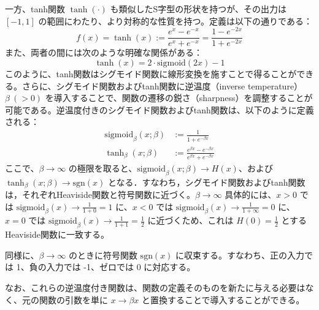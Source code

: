 \documentclass[titlepage]{ltjsbook}
\begin{document}
一方、tanh関数 $\tanh(\cdot)$ も類似したS字型の形状を持つが、その出力は $[-1, 1]$ の範囲にわたり、より対称的な性質を持つ。定義は以下の通りである：
\begin{equation}
f(x) = \tanh(x) := \frac{e^{x} - e^{-x}}{e^{x} + e^{-x}} = \frac{1 - e^{-2x}}{1 + e^{-2x}}
\end{equation}
また、両者の間には次のような明確な関係がある：
\begin{equation}
\tanh(x) = 2\cdot \mathrm{sigmoid}(2x) - 1
\end{equation}
このように、tanh関数はシグモイド関数に線形変換を施すことで得ることができる。さらに、シグモイド関数およびtanh関数に逆温度（inverse temperature）$\beta\ (>0)$ を導入することで、関数の遷移の鋭さ（sharpness）を調整することが可能である。逆温度付きのシグモイド関数およびtanh関数は、以下のように定義される：
\begin{align}
\mathrm{sigmoid}_\beta(x; \beta)&:= \frac{1}{1 + e^{-\beta x}}\\
\tanh_\beta(x; \beta)&:= \frac{e^{\beta x} - e^{-\beta x}}{e^{\beta x} + e^{-\beta x}}
\end{align}
ここで、$\beta \to \infty$ の極限を取ると、$\mathrm{sigmoid}_\beta(x; \beta) \to H(x)$、および $\tanh_\beta(x; \beta) \to \mathrm{sgn}(x)$ となる．すなわち，シグモイド関数およびtanh関数は，それぞれHeaviside関数と符号関数に近づく。$\beta \to \infty$
具体的には、$x > 0$ では $\mathrm{sigmoid}_\beta(x)\to \frac{1}{1+0}=1$ 
に、$x < 0$ では $\mathrm{sigmoid}_\beta(x)\to \frac{1}{1+\infty}=0$ に、$x = 0$ では $\mathrm{sigmoid}_\beta(x) \to \frac{1}{1+1} = \frac{1}{2}$ に近づくため、これは $H(0) = \frac{1}{2}$ とするHeaviside関数に一致する。

同様に、$\beta \to \infty$ のときに符号関数 $\mathrm{sgn}(x)$ に収束する。すなわち、正の入力では 1、負の入力では -1、ゼロでは 0 に対応する。

なお、これらの逆温度付き関数は、関数の定義そのものを新たに与える必要はなく、元の関数の引数を単に $x \to \beta x$ と置換することで導入することができる。
\end{document}
